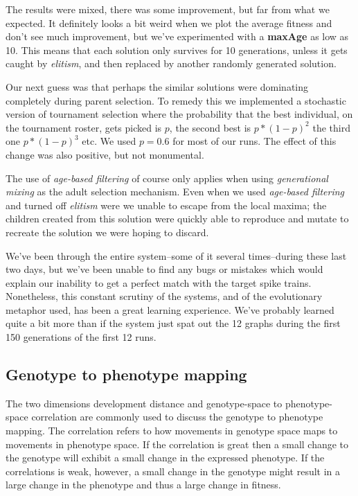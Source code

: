 \documentclass[a4paper]{article}
\begin{document}
The results were mixed, there was some improvement, but far from what we expected. It definitely looks a bit weird when we plot the average fitness and don't see much improvement, but we've experimented with a \textbf{maxAge} as low as 10. This means that each solution only survives for 10 generations, unless it gets caught by \textit{elitism}, and then replaced by another randomly generated solution.

Our next guess was that perhaps the similar solutions were dominating completely during parent selection. To remedy this we implemented a stochastic version of tournament selection where the probability that the best individual, on the tournament roster, gets picked is $p$, the second best is $p*(1-p)^2$ the third one $p*(1-p)^3$ etc. We used $p = 0.6$ for most of our runs. The effect of this change was also positive, but not monumental.

The use of \textit{age-based filtering} of course only applies when using \textit{generational mixing} as the adult selection mechanism. Even when we used \textit{age-based filtering} and turned off \textit{elitism} were we unable to escape from the local maxima; the children created from this solution were quickly able to reproduce and mutate to recreate the solution we were hoping to discard.

We've been through the entire system--some of it several times--during these last two days, but we've been unable to find any bugs or mistakes which would explain our inability to get a perfect match with the target spike trains. Nonetheless, this constant scrutiny of the systems, and of the evolutionary metaphor used, has been a great learning experience. We've probably learned quite a bit more than if the system just spat out the 12 graphs during the first 150 generations of the first 12 runs.

\subsection{Genotype to phenotype mapping}
\label{sec:genotype-phen-mapp}

The two dimensions development distance and genotype-space to phenotype-space correlation are commonly used to discuss the genotype to phenotype mapping. The correlation refers to how movements in genotype space maps to movements in phenotype space. If the correlation is great then a small change to the genotype will exhibit a small change in the expressed phenotype. If the correlations is weak, however, a small change in the genotype might result in a large change in the phenotype and thus a large change in fitness.
\end{document}
